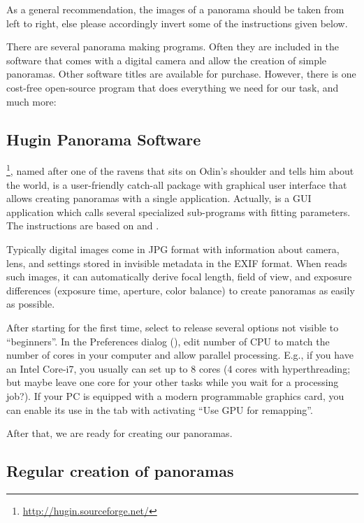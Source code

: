 As a general recommendation, the images of a panorama should be taken
from left to right, else please accordingly invert some of the
instructions given below.

There are several panorama making programs. Often they are included in
the software that comes with a digital camera and allow the creation
of simple panoramas. Other software titles are available for
purchase. However, there is one cost-free open-source program
that does everything we need for our task, and much more:


\subsection{Hugin Panorama Software}
\label{sec:landscapes:Hugin}

\footnote{\url{http://hugin.sourceforge.net/}}, named
after one of the ravens that sits on Odin's shoulder and tells him
about the world, is a user-friendly catch-all package with graphical
user interface that allows creating panoramas with a single
application. Actually,  is a GUI application which
calls several specialized sub-programs with fitting parameters.  The
instructions are based on  and
.

Typically digital images come in JPG format with information about
camera, lens, and settings stored in invisible metadata in the EXIF
format. When  reads such images, it can automatically derive
focal length, field of view, and exposure differences (exposure time,
aperture, color balance) to create panoramas as easily as
possible.

After starting  for the first time, select  to release several
options not visible to ``beginners''.  In the Preferences dialog
(), edit number of CPU to match the number of
cores in your computer and allow parallel processing. E.g., if you
have an Intel Core-i7, you usually can set up to 8 cores (4 cores with
hyperthreading; but maybe leave one core for your other tasks while
you wait for a processing job?).  If your PC is equipped with a
modern programmable graphics card, you can enable its use in the  tab
with activating ``Use GPU for remapping''.

After that, we are ready for creating our panoramas.


\subsection{Regular creation of panoramas}
\label{sec:landscapes:Hugin:regular}

